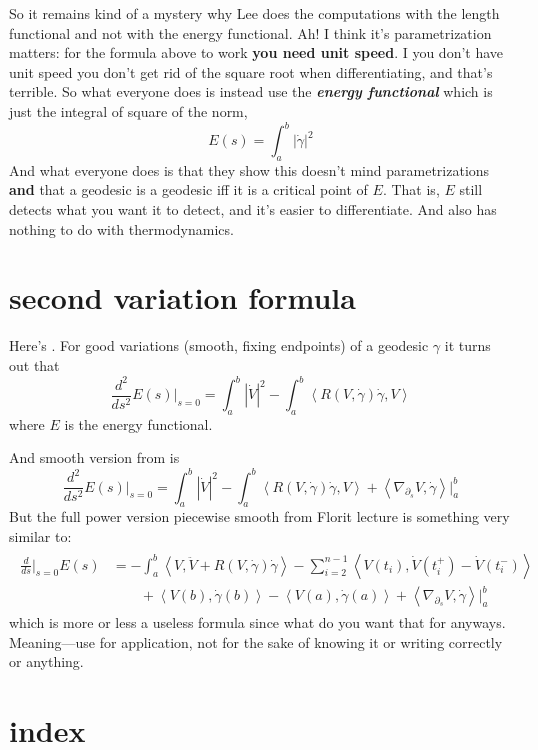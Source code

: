 So it remains kind of a mystery why Lee does the computations with the length functional and not with the energy functional. Ah! I think it's parametrization matters: for the formula above to work \textbf{you need unit speed}. I you don't have unit speed you don't get rid of the square root when differentiating, and that's terrible. So what everyone does is instead use the \textit{\textbf{energy functional}} which is just the integral of square of the norm,
\[\boxed{E(s)=\int_a^b |\dot \gamma|^2}\]
And what everyone does is that they show this doesn't mind parametrizations \textbf{and} that a geodesic is a geodesic iff it is a critical point of \(E\). That is, \(E\) still detects what you want it to detect, and it's easier to differentiate. And also has nothing to do with thermodynamics.
\section{second variation formula}

Here's  \cite{pet}. For good variations (smooth, fixing endpoints) of a geodesic \(\gamma\) it turns out that
\[\boxed{\frac{d^2}{ds^2}E(s)\Big|_{s=0}=\int_a^b |\dot V|^2- \int_a^b \left<R(V,\dot \gamma)\dot \gamma,V\right>}\]
where \(E\) is the energy functional.

And smooth version from \cite{pet} is
\[\boxed{\frac{d^2}{ds^2}E(s)\Big|_{s=0}=\int_a^b |\dot V|^2-\int_a^b \left<R(V,\dot \gamma)\dot\gamma,V\right>+\left<\nabla_{\partial_s}V,\dot\gamma\right>|_{a}^b}\]
But the full power version piecewise smooth from Florit lecture is something very similar to:
\begin{align*}
	\boxed{\begin{array}{rl}\frac{d}{ds}\Big|_{s=0}E(s)&=-\int_a^b\left<V,\ddot V+R(V,\dot \gamma)\dot \gamma\right>-\sum_{i=2}^{n-1}\left<V(t_i),\dot V(t^+_{i})-\dot V(t^-_{i})\right>\\
				   & \qquad +\left<V(b),\dot\gamma(b)\right>-\left<V(a),\dot\gamma(a)\right>+\left<\nabla_{\partial_s}V,\dot\gamma\right>|_{a}^b\end{array}}
	\end{align*}
which is more or less a useless formula since what do you want that for anyways. Meaning---use for application, not for the sake of knowing it or writing correctly or anything.

\section*{index}

